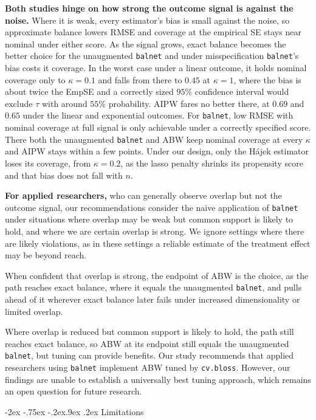 \documentclass[
  12pt,
  a4paper,
]{article}
\makeatletter
\renewcommand\subsection{\@startsection{subsection}{2}{\z@}%
  {-2ex \@plus -.75ex \@minus -.2ex}{.9ex \@plus .2ex}%
  {\normalfont\large\bfseries}}
\makeatother
\begin{document}
\textbf{Both studies hinge on how strong the outcome signal is against
the noise.} Where it is weak, every estimator's bias is small against
the noise, so approximate balance lowers RMSE and coverage at the
empirical SE stays near nominal under either score. As the signal grows,
exact balance becomes the better choice for the unaugmented
\texttt{balnet} and under misspecification \texttt{balnet}'s bias costs
it coverage. In the worst case under a linear outcome, it holds nominal
coverage only to \(\kappa = 0.1\) and falls from there to \(0.45\) at
\(\kappa = 1\), where the bias is about twice the EmpSE and a correctly
sized \(95\%\) confidence interval would exclude \(\tau\) with around
\(55\%\) probability. AIPW fares no better there, at \(0.69\) and
\(0.65\) under the linear and exponential outcomes. For \texttt{balnet},
low RMSE with nominal coverage at full signal is only achievable under a
correctly specified score. There both the unaugmented \texttt{balnet}
and ABW keep nominal coverage at every \(\kappa\) and AIPW stays within
a few points. Under our design, only the Hájek estimator loses its
coverage, from \(\kappa = 0.2\), as the lasso penalty shrinks its
propensity score and that bias does not fall with \(n\).

\textbf{For applied researchers,} who can generally observe overlap but
not the outcome signal, our recommendations consider the naive
application of \texttt{balnet} under situations where overlap may be
weak but common support is likely to hold, and where we are certain
overlap is strong. We ignore settings where there are likely violations,
as in these settings a reliable estimate of the treatment effect may be
beyond reach.

When confident that overlap is strong, the endpoint of ABW is the
choice, as the path reaches exact balance, where it equals the
unaugmented \texttt{balnet}, and pulls ahead of it wherever exact
balance later fails under increased dimensionality or limited overlap.

Where overlap is reduced but common support is likely to hold, the path
still reaches exact balance, so ABW at its endpoint still equals the
unaugmented \texttt{balnet}, but tuning can provide benefits. Our study
recommends that applied researchers using \texttt{balnet} implement ABW
tuned by \texttt{cv.bloss}. However, our findings are unable to
establish a universally best tuning approach, which remains an open
question for future research.

\subsection{Limitations}\label{limitations}
\end{document}
